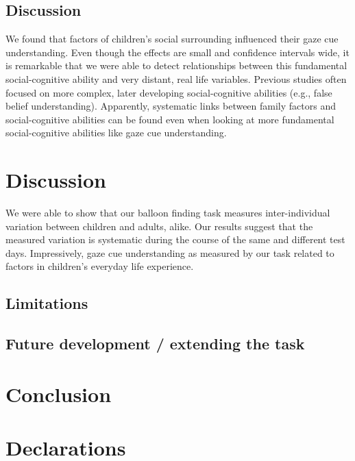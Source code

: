 \documentclass[
  man,floatsintext]{apa6}
\begin{document}
\hypertarget{discussion-2}{%
\subsection{Discussion}\label{discussion-2}}

We found that factors of children's social surrounding influenced their gaze cue understanding. Even though the effects are small and confidence intervals wide, it is remarkable that we were able to detect relationships between this fundamental social-cognitive ability and very distant, real life variables. Previous studies often focused on more complex, later developing social-cognitive abilities (e.g., false belief understanding). Apparently, systematic links between family factors and social-cognitive abilities can be found even when looking at more fundamental social-cognitive abilities like gaze cue understanding.

\hypertarget{discussion-3}{%
\section{Discussion}\label{discussion-3}}

We were able to show that our balloon finding task measures inter-individual variation between children and adults, alike. Our results suggest that the measured variation is systematic during the course of the same and different test days. Impressively, gaze cue understanding as measured by our task related to factors in children's everyday life experience.

\hypertarget{limitations}{%
\subsection{Limitations}\label{limitations}}

\hypertarget{future-development-extending-the-task}{%
\subsection{Future development / extending the task}\label{future-development-extending-the-task}}

\hypertarget{conclusion}{%
\section{Conclusion}\label{conclusion}}

\hypertarget{declarations}{%
\section{Declarations}\label{declarations}}
\end{document}
